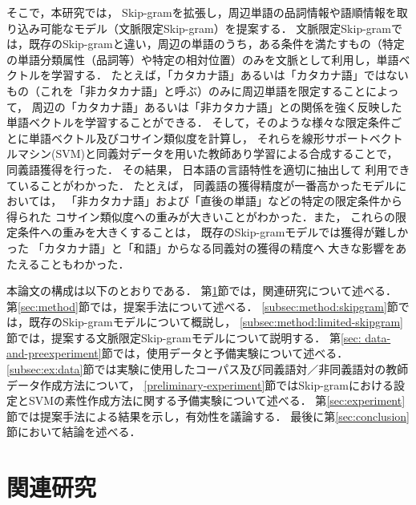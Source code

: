\documentclass[japanese]{jnlp_1.4}
\begin{document}
そこで，本研究では， Skip-gramを拡張し，周辺単語の品詞情報や語順情報を取り込み可能なモデル（文脈限定Skip-gram）を提案する．
文脈限定Skip-gramでは，既存のSkip-gramと違い，周辺の単語のうち，ある条件を満たすもの（特定の単語分類属性（品詞等）や特定の相対位置）のみを文脈として利用し，単語ベクトルを学習する．
たとえば，「カタカナ語」あるいは「カタカナ語」ではないもの（これを「非カタカナ語」と呼ぶ）のみに周辺単語を限定することによって，
周辺の「カタカナ語」あるいは「非カタカナ語」との関係を強く反映した単語ベクトルを学習することができる．
そして，そのような様々な限定条件ごとに単語ベクトル及びコサイン類似度を計算し，
それらを線形サポートベクトルマシン(SVM)と同義対データを用いた教師あり学習による合成することで，
同義語獲得を行った．
その結果，
日本語の言語特性を適切に抽出して
利用できていることがわかった．
たとえば，
同義語の獲得精度が一番高かったモデルにおいては，
「非カタカナ語」および「直後の単語」などの特定の限定条件から得られた
コサイン類似度への重みが大きいことがわかった．また，
これらの限定条件への重みを大きくすることは，
既存のSkip-gramモデルでは獲得が難しかった
「カタカナ語」と「和語」からなる同義対の獲得の精度へ
大きな影響をあたえることもわかった．

本論文の構成は以下のとおりである．
第\ref{sec:related-work}節では，関連研究について述べる．
第\ref{sec:method}節では，提案手法について述べる．
\ref{subsec:method:skipgram}節では，既存のSkip-gramモデルについて概説し，
\ref{subsec:method:limited-skipgram}節では，提案する文脈限定Skip-gramモデルについて説明する．
第\ref{sec: data-and-preexperiment}節では，使用データと予備実験について述べる．
\ref{subsec:ex:data}節では実験に使用したコーパス及び同義語対／非同義語対の教師データ作成方法について，
\ref{preliminary-experiment}節ではSkip-gramにおける設定とSVMの素性作成方法に関する予備実験について述べる．
第\ref{sec:experiment}節では提案手法による結果を示し，有効性を議論する．
最後に第\ref{sec:conclusion}節において結論を述べる．


\section{関連研究}
\label{sec:related-work}
\end{document}
